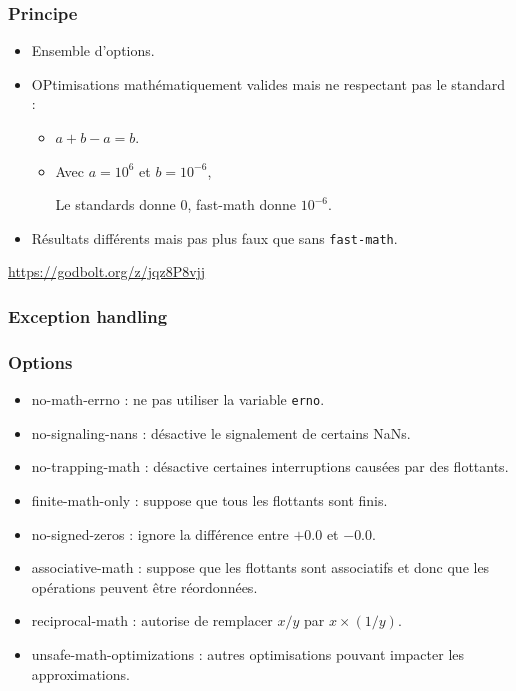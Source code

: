 \documentclass{beamer}
\begin{document}
\begin{frame}[fragile]
    \frametitle{Principe}

    \begin{itemize}
        \item Ensemble d'options.
        \item OPtimisations mathématiquement valides mais ne respectant pas le standard :
              \begin{itemize}
                  \item $a+b-a = b$.
                  \item Avec $a = 10^6$ et $b = 10^{-6}$,

                        Le standards donne $0$, fast-math donne $10^{-6}$.
              \end{itemize}
        \item Résultats différents mais pas plus faux que sans \verb'fast-math'.
    \end{itemize}

    \url{https://godbolt.org/z/jqz8P8vjj}
\end{frame}

\subsubsection{Exception handling}

\begin{frame}[fragile]
    \frametitle{Options}

    \begin{itemize}
        \item no-math-errno : ne pas utiliser la variable \verb'erno'.
        \item no-signaling-nans : désactive le signalement de certains NaNs.
        \item no-trapping-math : désactive certaines interruptions causées par des flottants.
        \item finite-math-only : suppose que tous les flottants sont finis.
        \item no-signed-zeros : ignore la différence entre $+0.0$ et $-0.0$.
        \item associative-math : suppose que les flottants sont associatifs et donc que les opérations peuvent être réordonnées.
        \item reciprocal-math : autorise de remplacer $x/y$ par $x \times (1/y)$.
        \item unsafe-math-optimizations : autres optimisations pouvant impacter les approximations.
    \end{itemize}
\end{frame}
\end{document}

